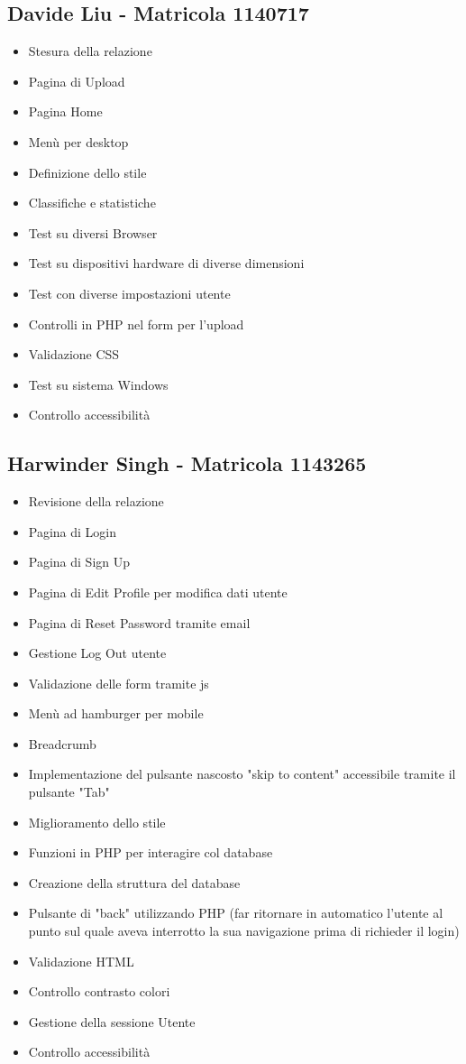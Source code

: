 \documentclass[openany, a4paper, 12pt]{report}
\begin{document}
	\subsection{Davide Liu - Matricola 1140717}
	\begin{itemize}
		\item Stesura della relazione
		\item Pagina di Upload
		\item Pagina Home
		\item Menù per desktop
		\item Definizione dello stile
		\item Classifiche e statistiche
		\item Test su diversi Browser
		\item Test su dispositivi hardware di diverse
		 dimensioni
		\item Test con diverse impostazioni utente
		\item Controlli in PHP nel form per l'upload
		\item Validazione CSS
		\item Test su sistema Windows
		\item Controllo accessibilità
	\end{itemize}
	\subsection{Harwinder Singh - Matricola 1143265}
	\begin{itemize}
		\item Revisione della relazione
		\item Pagina di Login
		\item Pagina di Sign Up
		\item Pagina di Edit Profile per modifica dati utente
		\item Pagina di Reset Password tramite email
		\item Gestione Log Out utente
		\item Validazione delle form tramite js
		\item Menù ad hamburger per mobile
		\item Breadcrumb
		\item Implementazione del pulsante nascosto "skip to content" accessibile tramite il pulsante "Tab" 
		\item Miglioramento dello stile
		\item Funzioni in PHP per interagire col database
		\item Creazione della struttura del database
		\item Pulsante di "back" utilizzando PHP (far ritornare in automatico l'utente al punto sul quale aveva interrotto la sua navigazione prima di richieder il login)
		\item Validazione HTML
		\item Controllo contrasto colori
		\item Gestione della sessione Utente
		\item Controllo accessibilità
	\end{itemize}
\end{document}

